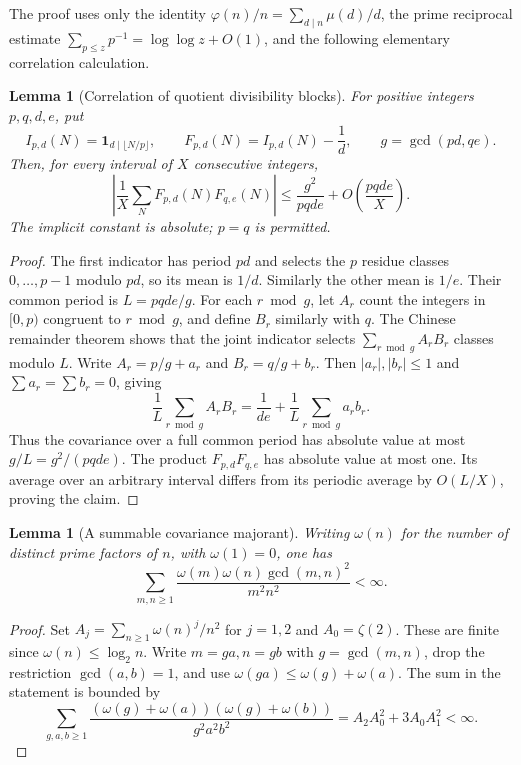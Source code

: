 \documentclass[11pt,a4paper]{article}
\newtheorem{lemma}[theorem]{Lemma}
\theoremstyle{definition}
\theoremstyle{remark}
\numberwithin{equation}{section}
\begin{document}
The proof uses only the identity $\varphi(n)/n=\sum_{d\mid n}\mu(d)/d$,
the prime reciprocal estimate $\sum_{p\leq z}p^{-1}=\log\log z+O(1)$,
and the following elementary correlation calculation.

\begin{lemma}[Correlation of quotient divisibility blocks]
\label{f13:lem:quotient-correlation}
For positive integers $p,q,d,e$, put
\[
 I_{p,d}(N)=\mathbf 1_{d\mid\lfloor N/p\rfloor},
 \qquad F_{p,d}(N)=I_{p,d}(N)-\frac1d,
 \qquad g=\gcd(pd,qe).
\]
Then, for every interval of $X$ consecutive integers,
\[
 \left|\frac1X\sum_N F_{p,d}(N)F_{q,e}(N)\right|
 \leq\frac{g^2}{pqde}+O\!\left(\frac{pqde}{X}\right).
\]
The implicit constant is absolute; $p=q$ is permitted.
\end{lemma}

\begin{proof}
The first indicator has period $pd$ and selects the $p$ residue classes
$0,\ldots,p-1$ modulo $pd$, so its mean is $1/d$. Similarly the other
mean is $1/e$. Their common period is $L=pqde/g$.
For each $r\bmod g$, let $A_r$ count the integers in $[0,p)$ congruent
to $r\bmod g$, and define $B_r$ similarly with $q$. The Chinese
remainder theorem shows that the joint indicator selects
$\sum_{r\bmod g}A_rB_r$ classes modulo $L$. Write
$A_r=p/g+a_r$ and $B_r=q/g+b_r$. Then
$|a_r|,|b_r|\leq1$ and $\sum a_r=\sum b_r=0$, giving
\[
 \frac1L\sum_{r\bmod g}A_rB_r
 =\frac1{de}+\frac1L\sum_{r\bmod g}a_rb_r.
\]
Thus the covariance over a full common period has absolute value at
most $g/L=g^2/(pqde)$. The product $F_{p,d}F_{q,e}$ has
absolute value at most one. Its average over an arbitrary interval
differs from its periodic average by $O(L/X)$, proving the claim.
\end{proof}

\begin{lemma}[A summable covariance majorant]\label{f13:lem:quotient-gcd-sum}
Writing $\omega(n)$ for the number of distinct prime factors of $n$,
with $\omega(1)=0$, one has
\[
 \sum_{m,n\geq1}
 \frac{\omega(m)\omega(n)\gcd(m,n)^2}{m^2n^2}<\infty.
\]
\end{lemma}
\begin{proof}
Set $A_j=\sum_{n\geq1}\omega(n)^j/n^2$ for $j=1,2$ and
$A_0=\zeta(2)$. These are finite since $\omega(n)\leq\log_2n$.
Write $m=ga,n=gb$ with $g=\gcd(m,n)$, drop the restriction
$\gcd(a,b)=1$, and use $\omega(ga)\leq\omega(g)+\omega(a)$.
The sum in the statement is bounded by
\[
 \sum_{g,a,b\geq1}
 \frac{(\omega(g)+\omega(a))(\omega(g)+\omega(b))}{g^2a^2b^2}
 = A_2A_0^2+3A_0A_1^2<\infty.
\]
\end{proof}
\end{document}
